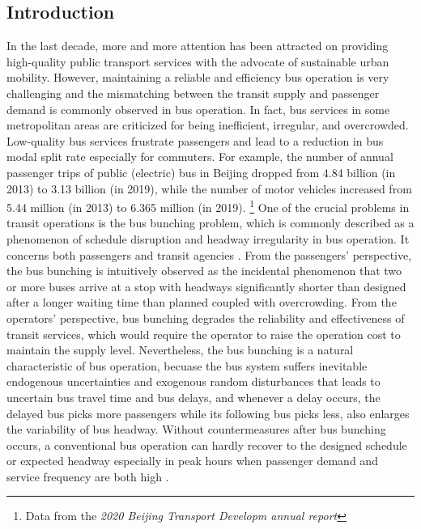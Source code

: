 \documentclass[smallextended]{svjour3}       %
\begin{document}
\begin{Abstract}
\section{Introduction}
\label{intro}
In the last decade, more and more attention has been attracted on providing high-quality public transport services with the advocate of sustainable urban mobility.
However, maintaining a reliable and efficiency bus operation is very challenging and the mismatching between the transit supply and passenger demand is commonly observed in bus operation.
In fact, bus services in some metropolitan areas are criticized for being inefficient, irregular, and overcrowded.
Low-quality bus services frustrate passengers and lead to a reduction in bus modal split rate especially for commuters.
For example, the number of annual passenger trips of public (electric) bus in Beijing dropped from 4.84 billion (in 2013) to 3.13 billion (in 2019),
while the number of motor vehicles increased from 5.44 million (in 2013) to 6.365 million (in 2019).
\footnote[1]{Data from the \textit{2020 Beijing Transport Developm annual report}}
One of the crucial problems in transit operations is the bus bunching problem, which is commonly described as a phenomenon of schedule disruption and headway irregularity in bus operation.
It concerns both passengers and transit agencies \citep{1964Nwell,1972Osuna,2008Hollander,2016Verbich}.
From the passengers' perspective, the bus bunching is intuitively observed as the incidental phenomenon that 
two or more buses arrive at a stop with headways significantly shorter than designed after a longer waiting time than planned coupled with overcrowding.
From the operators' perspective, bus bunching degrades the reliability and effectiveness of transit services, which would require the operator to raise the operation cost to maintain the supply level. 
Nevertheless, the bus bunching is a natural characteristic of bus operation, becuase the bus system suffers inevitable endogenous uncertainties and exogenous random disturbances that leads to uncertain bus travel time and bus delays, and whenever a delay occurs, the delayed bus picks more passengers while its following bus picks less, also enlarges the variability of bus headway. Without countermeasures after bus bunching occurs, a conventional bus operation can hardly recover to the designed schedule or expected headway especially in peak hours when passenger demand and service frequency are both high \citep{1964Nwell,2001Hickman,2009Daganzo}.


\end{Abstract}
\end{document}
